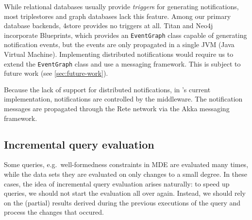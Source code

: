 While relational databases usually provide \emph{trigger}s for generating notifications, most triplestores and graph databases lack this feature. Among our primary database backends, 4store provides no triggers at all. Titan and Neo4j incorporate Blueprints, which provides an \texttt{EventGraph} class capable of generating notification events, but the events are only propagated in a single JVM (Java Virtual Machine). Implementing distributed notifications would require us to extend the \texttt{EventGraph} class and use a messaging framework. This is subject to future work (see \autoref{sec:future-work}). 

Because the lack of support for distributed notifications, in \iqd{}'s current implementation, notifications are controlled by the middleware. The notification messages are propagated through the Rete network via the Akka messaging framework. 








\subsection{Incremental query evaluation}
\label{subsec:incrementality}


Some queries, e.g.\ well-formedness constraints in MDE are evaluated many times, while the data sets they are evaluated on only changes to a small degree. In these cases, the idea of incremental query evaluation arises naturally: to speed up queries, we should not start the evaluation all over again. Instead, we should rely on the (partial) results derived during the previous executions of the query and process the changes that occured.
 
